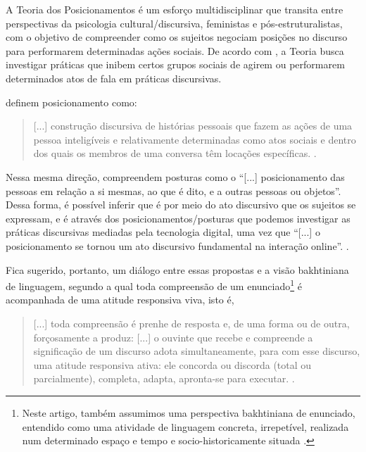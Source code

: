 \documentclass[portuguese]{textolivre}
\begin{document}
A Teoria dos Posicionamentos é um esforço multidisciplinar que transita entre perspectivas da psicologia cultural/discursiva, feministas e pós-estruturalistas, com o objetivo de compreender como os sujeitos negociam posições no discurso para performarem determinadas ações sociais. De acordo com \textcite{kayi-aydar_positioning_2019}, a Teoria busca investigar práticas que inibem certos grupos sociais de agirem ou performarem determinados atos de fala em práticas discursivas. 					

\textcite{harre_positioning_1999} definem posicionamento como:

\begin{quote}
    [...] construção discursiva de histórias pessoais que fazem as ações de uma pessoa inteligíveis e relativamente determinadas como atos sociais e dentro dos quais os membros de uma conversa têm locações específicas. \cite[p. 16]{harre_positioning_1999}.
\end{quote}

Nessa mesma direção, \textcite[p. 118]{barton_linguagem_2015} compreendem posturas como o “[...] posicionamento das pessoas em relação a si mesmas, ao que é dito, e a outras pessoas ou objetos”. Dessa forma, é possível inferir que é por meio do ato discursivo que os sujeitos se expressam, e é através dos posicionamentos/posturas que podemos investigar as práticas discursivas mediadas pela tecnologia digital, uma vez que “[...] o posicionamento se tornou um ato discursivo fundamental na interação online”. \cite[p. 118]{barton_linguagem_2015}. 

Fica sugerido, portanto, um diálogo entre essas propostas e a visão bakhtiniana de linguagem, segundo a qual toda compreensão de um enunciado\footnote{Neste artigo, também assumimos uma perspectiva bakhtiniana de enunciado, entendido como uma atividade de linguagem concreta, irrepetível, realizada num determinado espaço e tempo e socio-historicamente situada \cite{molon_o_2012}.} é acompanhada de uma atitude responsiva viva, isto é,

\begin{quote}
    [...] toda compreensão é prenhe de resposta e, de uma forma ou de outra, forçosamente a produz: [...] o ouvinte que recebe e compreende a significação de um discurso adota simultaneamente, para com esse discurso, uma atitude responsiva ativa: ele concorda ou discorda (total ou parcialmente), completa, adapta, apronta-se para executar. \cite[p. 290]{bakhtin_estetica_1992}.
\end{quote}
\end{document}
